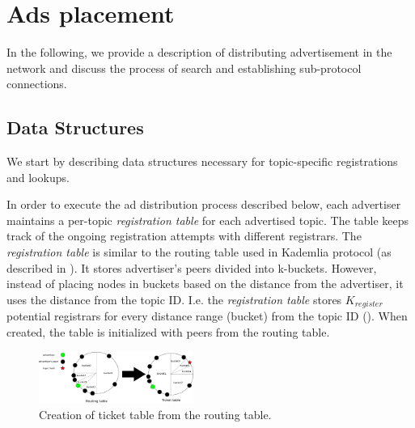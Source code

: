 
\section{Ads placement}
\label{sec:placement}
In the following, we provide a description of distributing advertisement in the network and discuss the process of search and establishing sub-protocol connections. 


\subsection{Data Structures}\label{sec:struct}
We start by describing data structures necessary for topic-specific registrations and lookups. 

In order to execute the ad distribution process described below,  each advertiser maintains a per-topic \emph{registration table} for each advertised topic. The table keeps track of the ongoing registration attempts with different registrars.  The \emph{registration table} is similar to the routing table used in Kademlia protocol (as described in ). It stores advertiser's peers divided into k-buckets. However, instead of placing nodes in buckets based on the distance from the advertiser, it uses the distance from the topic ID. I.e. the \emph{registration table} stores $K_\textit{register}$ potential registrars for every distance range (bucket) from the topic ID (). When created, the table is initialized with peers from the routing table. 


\begin{figure}
    \includegraphics[width=0.45\textwidth]{img/ticket_table}
    \caption{Creation of ticket table from the routing table.}
    \label{fig:ticket_table}
 \end{figure}


